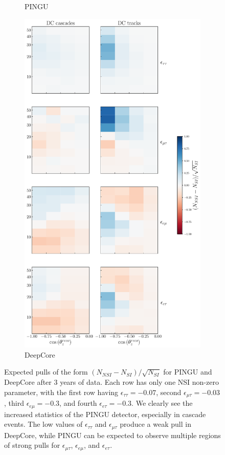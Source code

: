 \documentclass{article}
\newcommand{\emt}{\ensuremath{\epsilon_{\mu\tau}}}
\newcommand{\eet}{\epsilon_{e\tau}}
\newcommand{\eem}{\epsilon_{e\mu}}
\newcommand{\ett}{\ensuremath{\epsilon_{\tau\tau}}}
\begin{document}
{{\begin{figure}[t]
\begin{center}
\begin{subfigure}{0.44\textwidth}
          \caption{PINGU}\label{fig:PINGU_event_pulls}
       \end{subfigure}
       \begin{subfigure}{0.54\textwidth}
          \includegraphics[width=1\linewidth]{figures/DC_event_pulls.pdf}
          \caption{DeepCore}\label{fig:DC_event_pulls}
       \end{subfigure}
     \end{center}
    \caption{Expected pulls of the form $(N_{NSI} - N_{SI})/\sqrt{N_{SI}}$ for PINGU and DeepCore after 3 years of data. 
    Each row has only one NSI non-zero parameter, with the first row having $\ett= -0.07$, second $\emt = -0.03$, third $\eem = -0.3$, and fourth $\eet = -0.3$.
    We clearly see the increased statistics of the PINGU detector, especially in cascade events. The low values of $\ett$ and $\emt$ produce a weak pull in DeepCore,
    while PINGU can be expected to observe multiple regions of strong pulls for $\emt$, $\eem$, and $\eet$.}\label{fig:event_pulls}
 \end{figure}
 
}}
\end{document}
